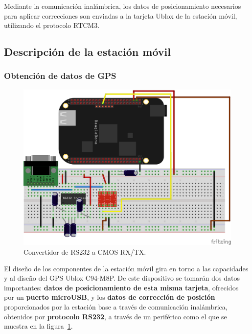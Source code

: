 Mediante la comunicación inalámbrica, los datos de posicionamiento necesarios para aplicar correcciones son enviadas a la tarjeta Ublox de la estación móvil, utilizando el protocolo RTCM3.

\subsection{Descripción de la estación móvil}

\subsubsection{Obtención de datos de GPS}

\begin{figure}[H]
\centering
\includegraphics[scale=0.75]{Figures/Max232}
\caption[Convertidor de RS232 a CMOS RX/TX.]{Convertidor de RS232 a CMOS RX/TX.\footnotemark}
\label{fig:convert}
\end{figure}


El diseño de los componentes de la estación móvil gira en torno a las capacidades y al diseño del GPS Ublox C94-M8P. De este dispositivo se tomarán dos datos importantes: \textbf{datos de posicionamiento de esta misma tarjeta}, ofrecidos por un \textbf{puerto microUSB}, y los \textbf{datos de corrección de posición} proporcionados por la estación base a través de comunicación inalámbrica, obtenidos por \textbf{protocolo RS232}, a través de un periférico como el que se muestra en la figura~\ref{fig:convert}.\\

